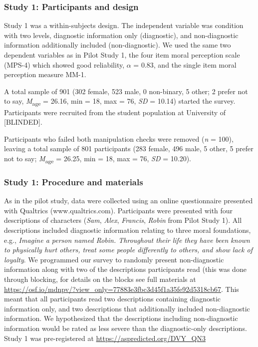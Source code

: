 \documentclass[
  english,
  man,floatsintext]{apa7}
\begin{document}
\hypertarget{study-1-participants-and-design}{%
\subsubsection{Study 1: Participants and design}\label{study-1-participants-and-design}}

Study 1 was a within-subjects design. The independent variable was condition with two levels, diagnostic information only (diagnostic), and non-diagnostic information additionally included (non-diagnostic). We used the same two dependent variables as in Pilot Study 1, the four item moral perception scale (MPS-4) which showed good reliability, \(\alpha\) = 0.83, and the single item moral perception measure MM-1.

A total sample of 901 (302 female, 523 male, 0 non-binary, 5 other; 2 prefer not to say, \emph{M}\textsubscript{age} = 26.16, min = 18, max = 76, \emph{SD} = 10.14) started the survey. Participants were recruited from the student population at University of {[}BLINDED{]}.

Participants who failed both manipulation checks were removed (\emph{n} = 100), leaving a total sample of 801 participants (283 female, 496 male, 5 other, 5 prefer not to say; \emph{M}\textsubscript{age} = 26.25, min = 18, max = 76, \emph{SD} = 10.20).

\hypertarget{study-1-procedure-and-materials}{%
\subsubsection{Study 1: Procedure and materials}\label{study-1-procedure-and-materials}}

As in the pilot study, data were collected using an online questionnaire presented with Qualtrics (www.qualtrics.com). Participants were presented with four descriptions of characters (\emph{Sam}, \emph{Alex}, \emph{Francis}, \emph{Robin} from Pilot Study 1). All descriptions included diagnostic information relating to three moral foundations, e.g., \emph{Imagine a person named Robin. Throughout their life they have been known to physically hurt others, treat some people differently to others, and show lack of loyalty}. We programmed our survey to randomly present non-diagnostic information along with two of the descriptions participants read (this was done through blocking, for details on the blocks see full materials at \color{blue}\url{https://osf.io/mdnpv/?view_only=77883e3fbc3d45f1a35fe92d5318cb67}\color{black}. This meant that all participants read two descriptions containing diagnostic information only, and two descriptions that additionally included non-diagnostic information. We hypothesized that the descriptions including non-diagnostic information would be rated as less severe than the diagnostic-only descriptions. Study 1 was pre-registered at \color{blue}\url{https://aspredicted.org/DVY_QN3}\color{black}
\end{document}

